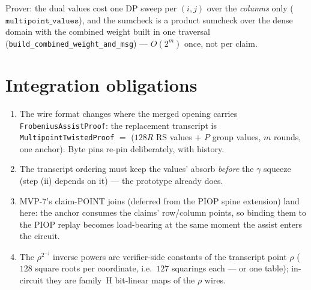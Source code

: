 \documentclass[11pt]{article}
\newcommand{\code}[1]{\texttt{#1}}
\begin{document}
Prover: the dual values cost one DP sweep per $(i,j)$ over the
\emph{columns} only ($\code{multipoint\_values}$), and the sumcheck is a
product sumcheck over the dense domain with the combined weight built in one
traversal (\code{build\_combined\_weight\_and\_msg}) — $O(2^m)$ once, not
per claim.

\section{Integration obligations}

\begin{enumerate}[nosep]
  \item The wire format changes where the merged opening carries
        \code{FrobeniusAssistProof}: the replacement transcript is
        \code{MultipointTwistedProof} $=$ ($128R$ RS values $+$ $P$ group
        values, $m$ rounds, one anchor). Byte pins re-pin deliberately,
        with history.
  \item The transcript ordering must keep the values' absorb \emph{before}
        the $\gamma$ squeeze (step (ii) depends on it) — the prototype
        already does.
  \item MVP-7's claim-POINT joins (deferred from the PIOP spine extension)
        land here: the anchor consumes the claims' row/column points, so
        binding them to the PIOP replay becomes load-bearing at the same
        moment the assist enters the circuit.
  \item The $\rho^{2^{-j}}$ inverse powers are verifier-side constants of
        the transcript point $\rho$ ($128$ square roots per coordinate,
        i.e.\ $127$ squarings each — or one table); in-circuit they are
        family~H bit-linear maps of the $\rho$ wires.
\end{enumerate}
\end{document}
